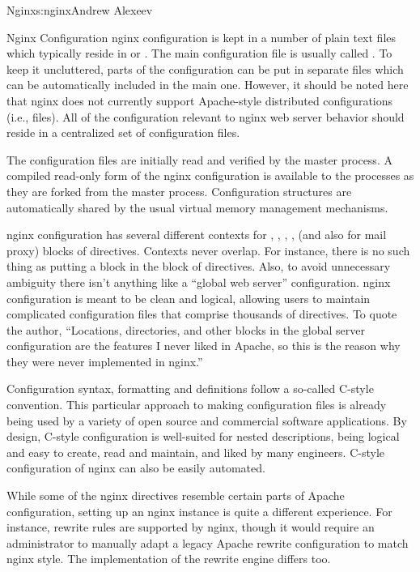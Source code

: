 \begin{aosachapter}{Nginx}{s:nginx}{Andrew Alexeev}
\begin{aosasect1}{Nginx Configuration}
nginx configuration is kept in a number of plain text files which
typically reside in  or
. The main configuration file is usually called
. To keep it uncluttered, parts of the configuration
can be put in separate files which can be automatically included in
the main one. However, it should be noted here that nginx does not
currently support Apache-style distributed configurations (i.e.,
 files). All of the configuration relevant to nginx
web server behavior should reside in a centralized set of
configuration files.

The configuration files are initially read and verified by the master
process. A compiled read-only form of the nginx configuration is
available to the  processes as they are forked from the
master process. Configuration structures are automatically shared by
the usual virtual memory management mechanisms.

nginx configuration has several different contexts for ,
, , ,  (and also
 for mail proxy) blocks of directives. Contexts never
overlap. For instance, there is no such thing as putting a
 block in the  block of directives. Also, to
avoid unnecessary ambiguity there isn't anything like a ``global web
server'' configuration. nginx configuration is meant to be clean and
logical, allowing users to maintain complicated configuration files
that comprise thousands of directives. To quote the author,
``Locations, directories, and other blocks in the global server
configuration are the features I never liked in Apache, so this is the
reason why they were never implemented in nginx.''

Configuration syntax, formatting and definitions follow a so-called
C-style convention. This particular approach to making configuration
files is already being used by a variety of open source and
commercial software applications. By design, C-style configuration is well-suited 
for nested descriptions, being logical and easy to create, read
and maintain, and liked by many engineers. C-style configuration of
nginx can also be easily automated.

While some of the nginx directives resemble certain parts of Apache
configuration, setting up an nginx instance is quite a different
experience. For instance, rewrite rules are supported by nginx, though
it would require an administrator to manually adapt a legacy Apache
rewrite configuration to match nginx style. The implementation of the
rewrite engine differs too.


\end{aosasect1}
\end{aosachapter}
